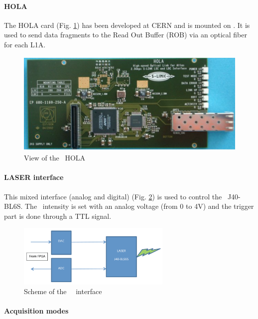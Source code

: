 \paragraph{HOLA}

The HOLA card \cite{ref:hola} (Fig. \ref{fig:laslascarhola}) has been developed at CERN and is mounted on \lascar. It is used to send data fragments to the Read Out Buffer (ROB) via an optical fiber for each L1A.
\begin{figure}[htbp]

\centering
\includegraphics[height=5cm]{figures/hola.pdf}
\caption{View of the \lascar~HOLA}\label{fig:laslascarhola}
\end{figure}

\paragraph{LASER interface}

This mixed interface (analog and digital) (Fig. \ref{fig:laslaserint}) is used to control the \laser~J40-BL6S. The \laser~intensity is set with an analog voltage (from 0 to 4V) and the trigger part is done through a TTL signal.

\begin{figure}[htbp]

\centering
\includegraphics[height=3cm]{figures/laser_interface.pdf}
\caption{Scheme of the \lascar~\las~interface}\label{fig:laslaserint}
\end{figure}

\paragraph{Acquisition modes}

